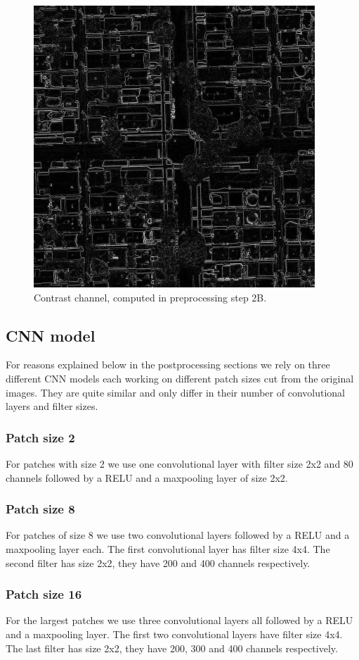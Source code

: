 \documentclass[10pt,conference,compsocconf]{IEEEtran}
\begin{document}
\begin{figure}
	\centering
	\includegraphics[width=.5\columnwidth]{pictures/preproc2}
	\caption{Contrast channel, computed in preprocessing step 2B.}
	\label{fig:preproc_simple}
\end{figure}

\subsection{CNN model}
For reasons explained below in the postprocessing sections we rely on three different CNN models each working on different patch sizes cut from the original images. They are quite similar and only differ in their number of convolutional layers and filter sizes. 
\subsubsection{Patch size 2}
	For patches with size 2 we use one convolutional layer with filter size 2x2 and 80 channels followed by a RELU and a maxpooling layer of size 2x2. 
\subsubsection{Patch size 8}
	For patches of size 8 we use two convolutional layers followed by a RELU and a maxpooling layer each. The first convolutional layer has filter size 4x4. The second filter has size 2x2, they have 200 and 400 channels respectively. 
\subsubsection{Patch size 16}
    For the largest patches we use three convolutional layers all followed by a RELU and a maxpooling layer. The first two convolutional layers have filter size 4x4. The last filter has size 2x2, they have 200, 300 and 400 channels respectively. 
    
\end{document}
